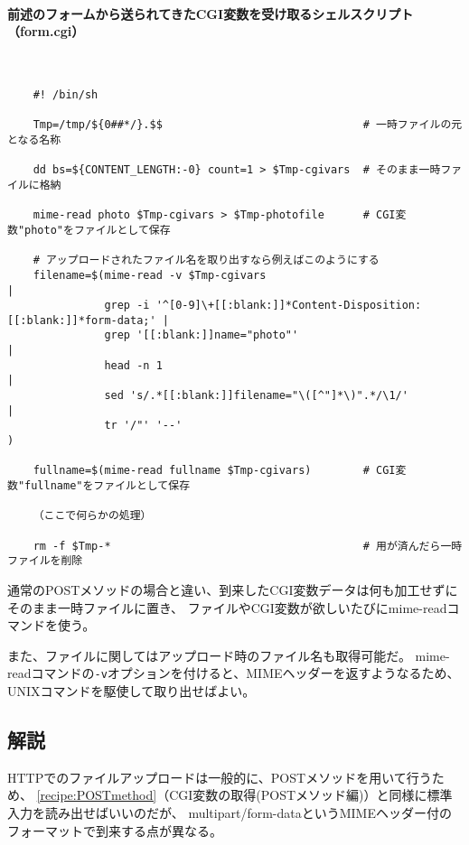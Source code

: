 \paragraph{前述のフォームから送られてきたCGI変数を受け取るシェルスクリプト（form.cgi）} 　\\
\begin{frameboxit}{160.0mm}
\begin{verbatim}
	#! /bin/sh
	
	Tmp=/tmp/${0##*/}.$$                               # 一時ファイルの元となる名称
	
	dd bs=${CONTENT_LENGTH:-0} count=1 > $Tmp-cgivars  # そのまま一時ファイルに格納
	
	mime-read photo $Tmp-cgivars > $Tmp-photofile      # CGI変数"photo"をファイルとして保存

	# アップロードされたファイル名を取り出すなら例えばこのようにする
	filename=$(mime-read -v $Tmp-cgivars                                                |
	           grep -i '^[0-9]\+[[:blank:]]*Content-Disposition:[[:blank:]]*form-data;' |
	           grep '[[:blank:]]name="photo"'                                           |
	           head -n 1                                                                |
	           sed 's/.*[[:blank:]]filename="\([^"]*\)".*/\1/'                          |
	           tr '/"' '--'                                                             )

	fullname=$(mime-read fullname $Tmp-cgivars)        # CGI変数"fullname"をファイルとして保存

	（ここで何らかの処理）
	
	rm -f $Tmp-*                                       # 用が済んだら一時ファイルを削除
\end{verbatim}
\end{frameboxit}

通常のPOSTメソッドの場合と違い、到来したCGI変数データは何も加工せずにそのまま一時ファイルに置き、
ファイルやCGI変数が欲しいたびにmime-readコマンドを使う。

また、ファイルに関してはアップロード時のファイル名も取得可能だ。
mime-readコマンドの\verb|-v|オプションを付けると、MIMEヘッダーを返すようなるため、
UNIXコマンドを駆使して取り出せばよい。

\subsection*{解説}

HTTPでのファイルアップロードは一般的に、POSTメソッドを用いて行うため、
\ref{recipe:POSTmethod}（CGI変数の取得(POSTメソッド編)）と同様に標準入力を読み出せばいいのだが、
multipart/form-dataというMIMEヘッダー付のフォーマットで到来する点が異なる。

